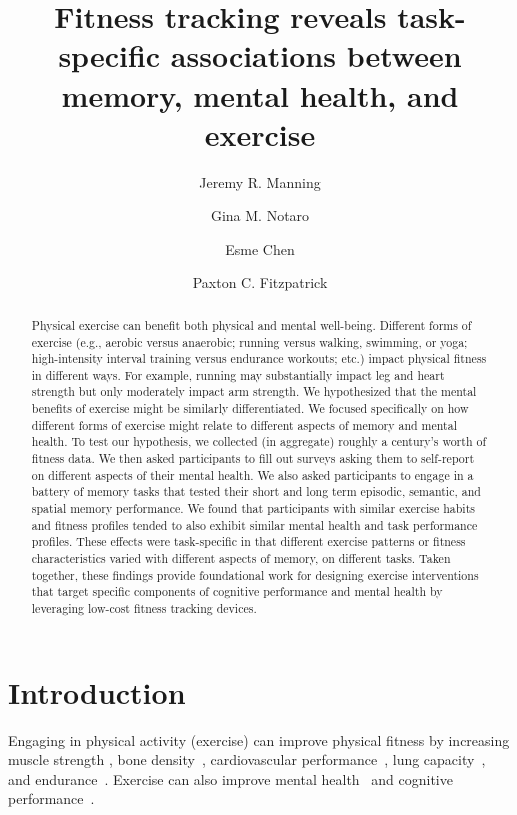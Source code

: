 \documentclass[10pt]{article}
\title{Fitness tracking reveals task-specific associations between
  memory, mental health, and exercise}
\author[1, $\star$]{Jeremy R. Manning}
\author[1]{Gina M. Notaro}
\author[1]{Esme Chen}
\author[1]{Paxton C. Fitzpatrick}
\affil[1]{Dartmouth College, Hanover, NH}
\affil[$\star$]{Address correspondence to
  jeremy.r.manning@dartmouth.edu}
\begin{document}
\maketitle

\newpage
\begin{abstract}
  Physical exercise can benefit both physical and mental well-being.
  Different forms of exercise (e.g., aerobic versus anaerobic; running
  versus walking, swimming, or yoga; high-intensity interval training
  versus endurance workouts; etc.) impact physical fitness in
  different ways.  For example, running may substantially impact leg
  and heart strength but only moderately impact arm strength. We
  hypothesized that the mental benefits of exercise might be similarly
  differentiated.  We focused specifically on how different forms of
  exercise might relate to different aspects of memory and mental
  health.  To test our hypothesis, we collected (in aggregate) roughly
  a century's worth of fitness data.  We then asked participants to
  fill out surveys asking them to self-report on different aspects of
  their mental health.  We also asked participants to engage in a
  battery of memory tasks that tested their short and long term
  episodic, semantic, and spatial memory performance.  We found that
  participants with similar exercise habits and fitness profiles
  tended to also exhibit similar mental health and task performance
  profiles.  These effects were task-specific in that different
  exercise patterns or fitness characteristics varied with different
  aspects of memory, on different tasks.  Taken together, these
  findings provide foundational work for designing exercise
  interventions that target specific components of cognitive performance
  and mental health by leveraging low-cost fitness tracking devices.
\end{abstract}

\section*{Introduction}
Engaging in physical activity (exercise) can improve physical fitness
by increasing muscle strength \citep{RogeEvan93, Lind79, CranEtal13,
  Knut07}, bone density~\citep{ChilEtal12, BassRams94, LaynNels99},
cardiovascular performance~\citep{MaioEtal00, PollEtal00}, lung
capacity~\citep[][although see \cite{RomaEtal16}]{LazoEtal16}, and
endurance~\citep{WilmKnut03}.  Exercise can also improve mental
health~\citep{Ragl90, MikkEtal17, TaylEtal85, DeslEtal09, Call04,
  PaluSchw00, BassSuzu17} and cognitive
performance~\citep{ChanEtal12b, BrisEtal02, EtniEtal06, BassSuzu17}.
\end{document}
